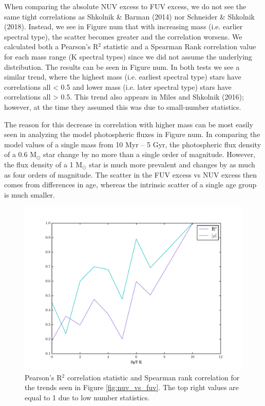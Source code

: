 \documentclass[twocolumn]{aastex62}
\begin{document}
When comparing the absolute NUV excess to FUV excess, we do not see the same tight correlations as Shkolnik & Barman (2014) nor Schneider & Shkolnik (2018). Instead, we see in Figure num that with increasing mass (i.e. earlier spectral type), the scatter becomes greater and the correlation worsens. We calculated both a Pearson’s R$^2$ statistic and a Spearman Rank correlation value for each mass range (K spectral types) since we did not assume the underlying distribution.  The results can be seen in Figure num. In both tests we see a similar trend, where the highest mass (i.e. earliest spectral type) stars have correlations all < 0.5 and lower mass (i.e. later spectral type) stars have correlations all > 0.5. This trend also appears in Miles and Shkolnik (2016); however, at the time they assumed this was due to small-number statistics. 

The reason for this decrease in correlation with higher mass can be most easily seen in analyzing the model photospheric fluxes in Figure num. In comparing the model values of a single mass from 10 Myr -- 5 Gyr, the photospheric flux density of a 0.6 M$_{\odot}$ star change by no more than a single order of magnitude. However, the flux density of a 1 M$_{\odot}$ star is much more prevalent and changes by as much as four orders of magnitude. The scatter in the FUV excess vs NUV excess then comes from differences in age, whereas the intrinsic scatter of a single age group is much smaller. 


\begin{figure}[t]
\centering
\includegraphics[width=\linewidth]{R2_vs_spt.pdf}
\caption{Pearson's R$^2$ correlation statistic and Spearman rank correlation for the trends seen in Figure \ref{fig:nuv_vs_fuv}. The top right values are equal to 1 due to low number statistics.  \label{fig:r2_vs_spt}}
\end{figure}
\end{document}
